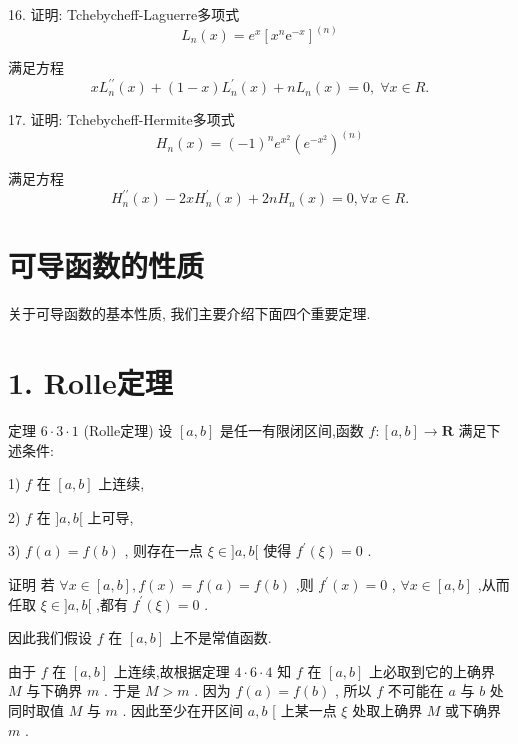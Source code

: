 16. 证明: Tchebycheff-Laguerre多项式
$${L}_{n}\left( x\right)  = {e}^{x}{\left\lbrack  {x}^{n}{\mathrm{e}}^{-x}\right\rbrack  }^{\left( n\right) }$$

满足方程
$$x{L}_{n}^{\prime \prime }\left( x\right)  + \left( {1 - x}\right) {L}_{n}^{\prime }\left( x\right)  + n{L}_{n}\left( x\right)  = 0,\;\forall x \in  R.$$

17. 证明: Tchebycheff-Hermite多项式
$${H}_{n}\left( x\right)  = {\left( -1\right) }^{n}{e}^{{x}^{2}}{\left( {e}^{-{x}^{2}}\right) }^{\left( n\right) }$$

满足方程
$${H}_{n}^{\prime \prime }\left( x\right)  - {2x}{H}_{n}^{\prime }\left( x\right)  + {2n}{H}_{n}\left( x\right)  = 0,\forall x \in  R.$$

\section{可导函数的性质}

关于可导函数的基本性质, 我们主要介绍下面四个重要定理.

\section*{1. Rolle定理}

定理 $6 \cdot  3 \cdot  1$ (Rolle定理) 设 $\left\lbrack  {a,b}\right\rbrack$ 是任一有限闭区间,函数 $f : \left\lbrack  {a,b}\right\rbrack   \rightarrow  \mathbf{R}$ 满足下述条件:

1) $f$ 在 $\left\lbrack  {a,b}\right\rbrack$ 上连续,

2) $f$ 在 $\rbrack a,b\lbrack$ 上可导,

3) $f\left( a\right)  = f\left( b\right)$ , 则存在一点 $\xi  \in  \rbrack a,b\lbrack$ 使得 ${f}^{\prime }\left( \xi \right)  = 0$ .

证明 若 $\forall x \in  \left\lbrack  {a,b}\right\rbrack  ,f\left( x\right)  = f\left( a\right)  = f\left( b\right)$ ,则 ${f}^{\prime }\left( x\right)  = 0$ , $\forall x \in  \left\lbrack  {a,b}\right\rbrack$ ,从而任取 $\xi  \in  \rbrack a,b\lbrack$ ,都有 ${f}^{\prime }\left( \xi \right)  = 0$ .

因此我们假设 $f$ 在 $\left\lbrack  {a,b}\right\rbrack$ 上不是常值函数.

由于 $f$ 在 $\left\lbrack  {a,b}\right\rbrack$ 上连续,故根据定理 $4 \cdot  6 \cdot  4$ 知 $f$ 在 $\left\lbrack  {a,b}\right\rbrack$ 上必取到它的上确界 $M$ 与下确界 $m$ . 于是 $M > m$ . 因为 $f\left( a\right)  = f\left( b\right)$ , 所以 $f$ 不可能在 $a$ 与 $b$ 处同时取值 $M$ 与 $m$ . 因此至少在开区间 $a,b$ [ 上某一点 $\xi$ 处取上确界 $M$ 或下确界 $m$ .

